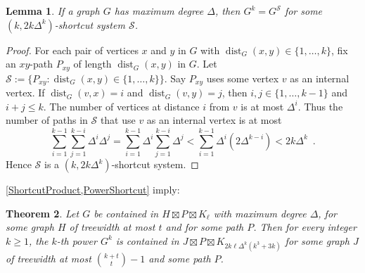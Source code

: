 \documentclass{patmorin}
\theoremstyle{plain}
\newtheorem{thm}{Theorem}
\newtheorem{lem}[thm]{Lemma}
\theoremstyle{definition}
\DeclareMathOperator{\dist}{dist}
\renewcommand{\SS}{\mathcal{S}}
\renewcommand{\geq}{\geqslant}
\renewcommand{\leq}{\leqslant}
\begin{document}
\begin{lem}
\label{PowerShortcut}
If a graph $G$ has maximum degree $\Delta$, then $G^k = G^\SS$ for some $(k,2k \Delta^{k})$-shortcut system $\SS$.
\end{lem}

\begin{proof}
For each pair of vertices $x$ and $y$ in $G$ with $\dist_G(x,y)\in\{1,\dots,k\}$, fix an $xy$-path $P_{xy}$ of length
$\dist_G(x,y)$  in $G$. Let $\SS:=\{P_{xy}: \dist_G(x,y)\in\{1,\dots,k\} \}$. Say $P_{xy}$ uses some vertex $v$ as an internal vertex. If $\dist_G(v,x)=i$ and $\dist_G(v,y)=j$, then $i,j\in\{1,\dots,k-1\}$ and $i+j\leq k$. The number of vertices at distance $i$ from $v$ is at most $\Delta^i$. Thus the number of paths in $\SS$ that use $v$ as an internal vertex is at most
\[\sum_{i=1}^{k-1} \sum_{j=1}^{k-i} \Delta^i\Delta^j
= \sum_{i=1}^{k-1} \Delta^i \sum_{j=1}^{k-i} \Delta^j
< \sum_{i=1}^{k-1} \Delta^i ( 2 \Delta^{k-i} )
< 2k \Delta^k\enspace.\]
Hence $\SS$ is a $(k, 2k \Delta^k)$-shortcut system.
\end{proof}

\cref{ShortcutProduct,PowerShortcut} imply:

\begin{thm}
\label{PowerProduct}
Let $G$ be contained in $H\boxtimes P\boxtimes K_\ell$ with maximum degree $\Delta$, for some graph $H$ of treewidth at most $t$ and for some path $P$. Then for every integer $k\geq 1$, the $k$-th power $G^k$ is contained in $J\boxtimes P\boxtimes K_{2k \ell \Delta^{k}(k^3+3k)}$ for some graph $J$ of treewidth at most $\binom{k+t}{t}-1$ and some path $P$.
\end{thm}
\end{document}
